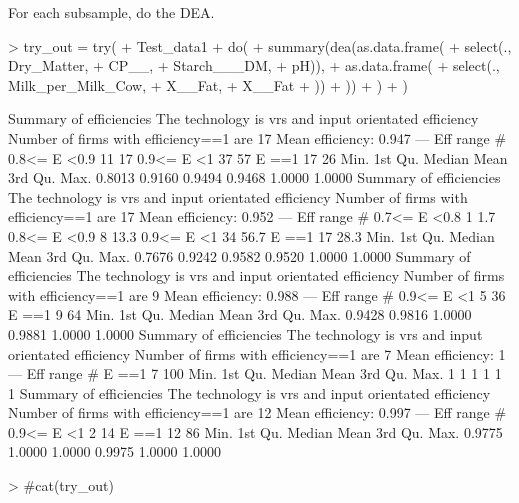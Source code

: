 \documentclass[12pt,]{article}
\begin{document}
For each subsample, do the DEA. 
\begin{Schunk}
\begin{Sinput}
> try_out = try(
+ Test_data1%>%
+   do({
+    summary(dea(as.data.frame(
+                   select(., Dry_Matter, 
+                   CP__, 
+                   Starch___DM, 
+                   pH)), 
+                as.data.frame(
+                  select(., Milk_per_Milk_Cow,
+                         X__Fat,
+                         X__Fat
+                    ))
+                  ))
+   })
+ )
\end{Sinput}
\begin{Soutput}
Summary of efficiencies
The technology is vrs and input orientated efficiency
Number of firms with efficiency==1 are 17 
Mean efficiency: 0.947 
---                
  Eff range       #  %
  0.8<= E <0.9   11 17
  0.9<= E <1     37 57
        E ==1    17 26
   Min. 1st Qu.  Median    Mean 3rd Qu.    Max. 
 0.8013  0.9160  0.9494  0.9468  1.0000  1.0000 
Summary of efficiencies
The technology is vrs and input orientated efficiency
Number of firms with efficiency==1 are 17 
Mean efficiency: 0.952 
---                
  Eff range       #    %
  0.7<= E <0.8    1  1.7
  0.8<= E <0.9    8 13.3
  0.9<= E <1     34 56.7
        E ==1    17 28.3
   Min. 1st Qu.  Median    Mean 3rd Qu.    Max. 
 0.7676  0.9242  0.9582  0.9520  1.0000  1.0000 
Summary of efficiencies
The technology is vrs and input orientated efficiency
Number of firms with efficiency==1 are 9 
Mean efficiency: 0.988 
---                
  Eff range      #  %
  0.9<= E <1     5 36
        E ==1    9 64
   Min. 1st Qu.  Median    Mean 3rd Qu.    Max. 
 0.9428  0.9816  1.0000  0.9881  1.0000  1.0000 
Summary of efficiencies
The technology is vrs and input orientated efficiency
Number of firms with efficiency==1 are 7 
Mean efficiency: 1 
---                
  Eff range      #   %
        E ==1    7 100
   Min. 1st Qu.  Median    Mean 3rd Qu.    Max. 
      1       1       1       1       1       1 
Summary of efficiencies
The technology is vrs and input orientated efficiency
Number of firms with efficiency==1 are 12 
Mean efficiency: 0.997 
---                
  Eff range       #  %
  0.9<= E <1      2 14
        E ==1    12 86
   Min. 1st Qu.  Median    Mean 3rd Qu.    Max. 
 0.9775  1.0000  1.0000  0.9975  1.0000  1.0000 
\end{Soutput}
\begin{Sinput}
> #cat(try_out)
\end{Sinput}
\end{Schunk}
\end{document}
